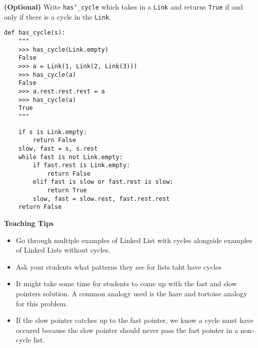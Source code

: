 \begin{blocksection}
\question \textbf{(Optional)} Write \texttt{has\char`_cycle} which takes in a
\texttt{Link} and returns \texttt{True} if and only if there is a cycle in the
\texttt{Link}.

\begin{lstlisting}
def has_cycle(s):
    """
    >>> has_cycle(Link.empty)
    False
    >>> a = Link(1, Link(2, Link(3)))
    >>> has_cycle(a)
    False
    >>> a.rest.rest.rest = a
    >>> has_cycle(a)
    True
    """
\end{lstlisting}

\begin{solution}
\begin{lstlisting}
    if s is Link.empty:
        return False
    slow, fast = s, s.rest
    while fast is not Link.empty:
        if fast.rest is Link.empty:
            return False
        elif fast is slow or fast.rest is slow:
            return True
        slow, fast = slow.rest, fast.rest.rest
    return False
\end{lstlisting}
\end{solution}

\begin{guide}
    \textbf{Teaching Tips}
    \begin{itemize}
       \item Go through multiple examples of Linked List with cycles alongside examples of Linked Lists without cycles.
       \item Ask your students what patterns they see for lists taht have cycles
       \item It might take some time for students to come up with the fast and slow pointers solution. A common analogy used is the hare and tortoise analogy for this problem.
       \item If the slow pointer catches up to the fast pointer, we know a cycle must have occured because the slow pointer should never pass the fast pointer in a non-cycle list.
    \end{itemize}
 \end{guide}

\end{blocksection}
